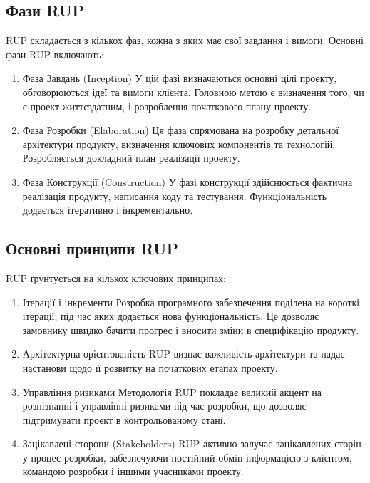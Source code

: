 \documentclass[letterpaper]{report}
\begin{document}
		\subsection{Фази RUP}

			RUP складається з кількох фаз, кожна з яких має свої завдання і вимоги. Основні фази RUP включають:

			\begin{enumerate}
				\item Фаза Завдань (Inception)
					У цій фазі визначаються основні цілі проекту, обговорюються ідеї та вимоги клієнта. Головною метою є визначення того, чи є проект життєздатним, і розроблення початкового плану проекту.
				\item Фаза Розробки (Elaboration)
					Ця фаза спрямована на розробку детальної архітектури продукту, визначення ключових компонентів та технологій. Розробляється докладний план реалізації проекту.
				\item Фаза Конструкції (Construction)
					У фазі конструкції здійснюється фактична реалізація продукту, написання коду та тестування. Функціональність додається ітеративно і інкрементально.
			\end{enumerate}

		\subsection{Основні принципи RUP}

			RUP ґрунтується на кількох ключових принципах:

			\begin{enumerate}
				\item Ітерації і інкременти
					Розробка програмного забезпечення поділена на короткі ітерації, під час яких додається нова функціональність. Це дозволяє замовнику швидко бачити прогрес і вносити зміни в специфікацію продукту.
				\item Архітектурна орієнтованість
					RUP визнає важливість архітектури та надає настанови щодо її розвитку на початкових етапах проекту.
				\item Управління ризиками
					Методологія RUP покладає великий акцент на розпізнанні і управлінні ризиками під час розробки, що дозволяє підтримувати проект в контрольованому стані.
				\item Зацікавлені сторони (Stakeholders)
					RUP активно залучає зацікавлених сторін у процес розробки, забезпечуючи постійний обмін інформацією з клієнтом, командою розробки і іншими учасниками проекту.
			\end{enumerate}
\end{document}
